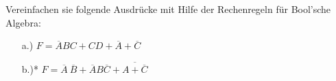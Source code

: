 \documentclass[a4paper,12pt]{article}
\begin{document}



 Vereinfachen sie folgende
Ausdrücke mit Hilfe der Rechenregeln für Bool'sche Algebra:

\begin{enumerate}[label=\alph*.)]
\item[a.)] $F=\overline{A}BC+CD+\overline{A}+\overline{C}$
\item[b.)*]
  $F=\overline{A}~\overline{B}+\overline{A}B\overline{C}+\overline{A+\overline{C}}$
\end{enumerate}

\end{document}
